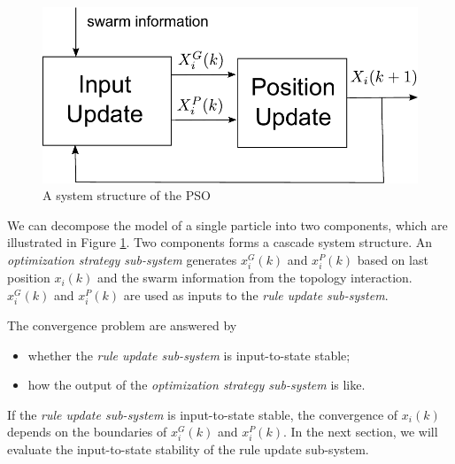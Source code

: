 \begin{figure}
\centering
\includegraphics[width=0.6\linewidth]{sys_flow.pdf}
\caption{A system structure of the PSO}
\label{fig:sys_flow}
\end{figure}

We can decompose the model of a single particle into two components, which are illustrated in Figure \ref{fig:sys_flow}.
Two components forms a cascade system structure.
An \emph{optimization strategy sub-system} generates $ x^{G}_{i}(k) $ and $ x^{P}_{i}(k) $ based on last position $ x_{i}(k) $ and the swarm information from the topology interaction.
$ x^{G}_{i}(k) $ and $ x^{P}_{i}(k) $ are used as inputs to the \emph{rule update sub-system}.

The convergence problem are answered by
\begin{itemize}
\item whether the \emph{rule update sub-system} is input-to-state stable;
\item how the output of the \emph{optimization strategy sub-system} is like.
\end{itemize}

If the \emph{rule update sub-system} is input-to-state stable, the convergence of $ x_{i}(k) $ depends on the boundaries of $ x^{G}_{i}(k) $ and $ x^{P}_{i}(k) $.
In the next section, we will evaluate the input-to-state stability of the rule update sub-system.

